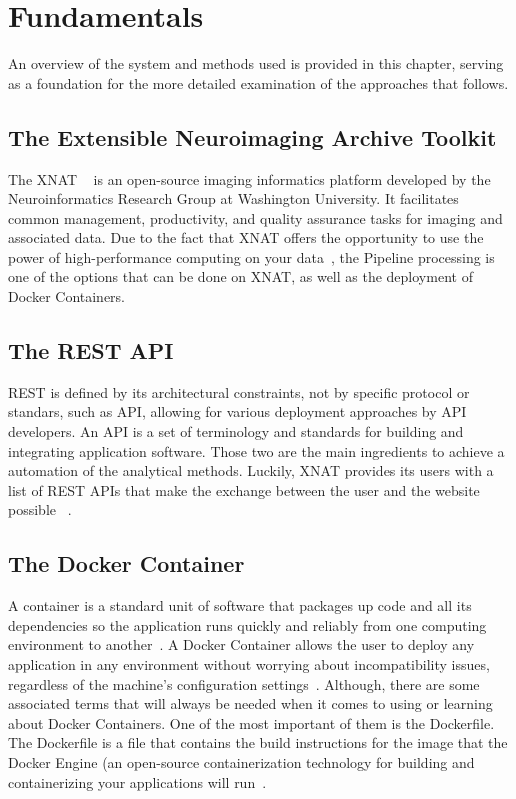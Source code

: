
\chapter{Fundamentals}

An overview of the system and methods used is provided in this chapter, serving as a foundation for the more detailed examination of the approaches that follows. 

\section{The Extensible Neuroimaging Archive Toolkit}
The \ac{XNAT} ~\cite{marcus_extensible_2007} is an open-source imaging informatics platform developed by the Neuroinformatics Research Group at Washington University. It facilitates common management, productivity, and quality assurance tasks for imaging and associated data. Due to the fact that XNAT offers the opportunity to use the power of high-performance computing on your data~\cite{zaschke_extending_2024}, 
 the Pipeline processing is one of the options that can be done on XNAT, as well as the deployment of Docker Containers.


\section{The REST API}
\ac{REST} is defined by its architectural constraints, not by specific protocol or standars, such as API, allowing for various deployment approaches by API developers.
An \ac{API} is a set of terminology and standards for building and integrating application software. Those two are the main ingredients to achieve a automation of the analytical methods.  Luckily, XNAT provides its users with a list of REST APIs that make the exchange between the user and the website possible
 ~\cite{REST_API}.

\section{The Docker Container}
A container is a standard unit of software that packages up code and all its dependencies so the application runs quickly and reliably from one computing environment to another~\cite{DockerContainer}.
A Docker Container allows the user to deploy any application in any environment without worrying about incompatibility issues, regardless of the machine’s configuration settings~\cite{what_is_Docker_Container}. Although, there are some associated terms that will always be needed when it comes to using or learning about Docker Containers.
One of the most important of them is the Dockerfile. The Dockerfile is a file that contains the build instructions for the image that the Docker Engine (an open-source containerization technology for building and containerizing your applications will run~\cite{DockerEngine}.
\\

